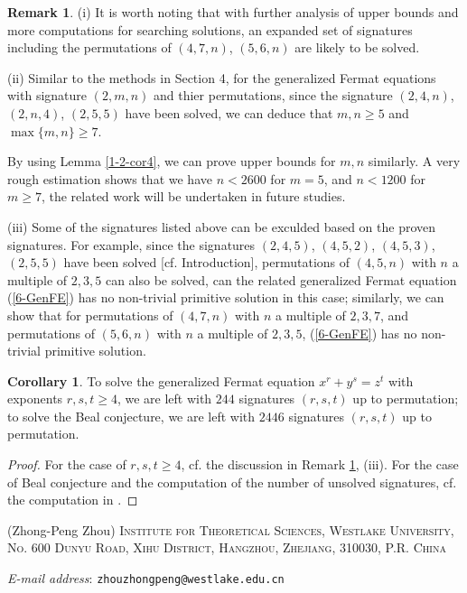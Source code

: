 \documentclass[a4paper, 12pt]{article}
\makeatletter
\numberwithin{equation}{section}
\theoremstyle{definition}
\newtheorem{cor}[thm]{Corollary}
\newtheorem{tiny-remark}{Remark}[thm]
\newcommand{\Addresses}{{%
\bigskip

(Zhong-Peng Zhou) \textsc{Institute for Theoretical Sciences, Westlake University, 
No. 600 Dunyu Road,
Xihu District, Hangzhou,
Zhejiang, 310030, P.R. China}
\par\nopagebreak
\textit{E-mail address}: 
\texttt{zhouzhongpeng@westlake.edu.cn}
}}
\makeatother
\begin{document}
\begin{tiny-remark} \label{5-rmk1}
(i) It is worth noting that with further analysis of upper bounds and more computations for searching solutions, an expanded set of signatures including the permutations of $(4, 7, n)$, $(5, 6, n)$ are likely to be solved.

(ii) Similar to the methods in Section 4, for the generalized Fermat equations with signature $(2,m,n)$ and thier permutations, since the signature $(2,4,n)$, $(2,n,4)$, $(2,5,5)$ have been solved, we can deduce that $m,n \ge 5$ and $\max\{m,n\} \ge 7$.

By using Lemma \ref{1-2-cor4}, we can prove upper bounds for $m,n$ similarly. A very rough estimation shows that we have $n < 2600$ for $m = 5$, and $n < 1200$ for $m\ge 7$, the related work will be undertaken in future studies.

(iii) Some of the signatures listed above can be exculded based on the proven signatures.
For example, since the signatures $(2,4,5)$, $(4,5,2)$, $(4,5,3)$, $(2,5,5)$ have been solved [cf. Introduction], permutations of $(4,5,n)$ with $n$ a multiple of $2,3,5$ can also be solved, can the related generalized Fermat equation (\ref{6-GenFE}) has no non-trivial primitive solution in this case; similarly, we can show that for permutations of $(4,7,n)$ with $n$ a multiple of $2,3,7$, and permutations of $(5,6,n)$ with $n$ a multiple of $2,3,5$, (\ref{6-GenFE}) has no non-trivial primitive solution.
\end{tiny-remark}

\begin{cor} \label{5-cor1}
To solve the generalized Fermat equation $x^r + y^s = z^t$ with exponents $r,s,t \ge 4$, we are left with $244$ signatures $(r,s,t)$ up to permutation;
to solve the Beal conjecture, we are left with $2446$ signatures $(r,s,t)$ up to permutation.
\end{cor}
\begin{proof}
For the case of $r,s,t\ge 4$, cf. the discussion in Remark \ref{5-rmk1}, (iii). 
For the case of Beal conjecture and the computation of the number of unsolved signatures, cf. the computation in \cite{code_of_zpzhou}.
\end{proof}










\Addresses
\end{document}
